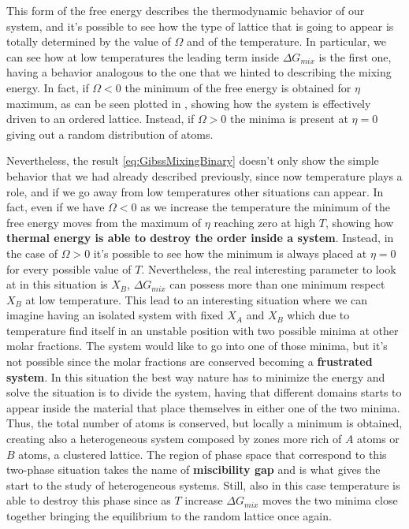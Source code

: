 This form of the free energy describes the thermodynamic behavior of our system, and it's possible to see how the type of lattice that is going to appear is totally determined by the value of $\Omega$ and of the temperature. In particular, we can see how at low temperatures the leading term inside $\Delta G_{mix}$ is the first one, having a behavior analogous to the one that we hinted to describing the mixing energy. In fact, if $\Omega < 0$ the minimum of the free energy is obtained for $\eta$ maximum, as can be seen plotted in , showing how the system is effectively driven to an ordered lattice. Instead, if $\Omega > 0$ the minima is present at $\eta = 0$ giving out a random distribution of atoms.

Nevertheless, the result \eqref{eq:GibssMixingBinary} doesn't only show the simple behavior that we had already described previously, since now temperature plays a role, and if we go away from low temperatures other situations can appear. In fact, even if we have $\Omega < 0$ as we increase the temperature the minimum of the free energy moves from the maximum of $\eta$ reaching zero at high $T$, showing how \textbf{thermal energy is able to destroy the order inside a system}. Instead, in the case of $\Omega > 0$ it's possible to see how the minimum is always placed at $\eta = 0$ for every possible value of $T$. Nevertheless, the real interesting parameter to look at in this situation is $X_B$, $\Delta G_{mix}$ can possess more than one minimum respect $X_B$ at low temperature. This lead to an interesting situation where we can imagine having an isolated system with fixed $X_A$ and $X_B$ which due to temperature find itself in an unstable position with two possible minima at other molar fractions. The system would like to go into one of those minima, but it's not possible since the molar fractions are conserved becoming a \textbf{frustrated system}. In this situation the best way nature has to minimize the energy and solve the situation is to divide the system, having that different domains starts to appear inside the material that place themselves in either one of the two minima. Thus, the total number of atoms is conserved, but locally a minimum is obtained, creating also a heterogeneous system composed by zones more rich of $A$ atoms or $B$ atoms, a clustered lattice. The region of phase space that correspond to this two-phase situation takes the name of \textbf{miscibility gap} and is what gives the start to the study of heterogeneous systems. Still, also in this case temperature is able to destroy this phase since as $T$ increase $\Delta G_{mix}$ moves the two minima close together bringing the equilibrium to the random lattice once again.

